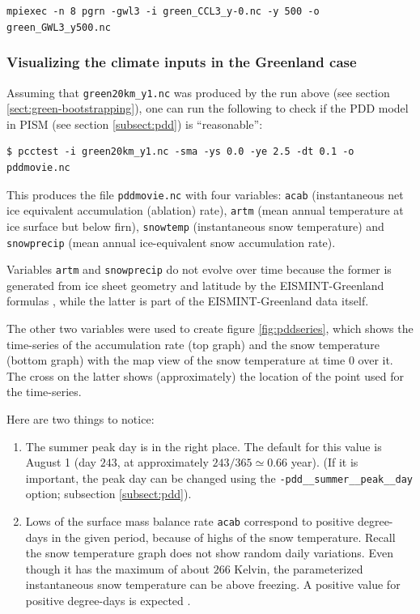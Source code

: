 \documentclass[11pt,final]{amsart}
\newcommand{\und}{\_\!\_}
\begin{document}
\verb|mpiexec -n 8 pgrn -gwl3 -i green_CCL3_y-0.nc -y 500 -o green_GWL3_y500.nc|

\subsubsection*{Visualizing the climate inputs in the Greenland case}
\label{sec:pdd-series-with-pcctest}

Assuming that \verb|green20km_y1.nc| was produced by the run above (see section
\ref{sect:green-bootstrapping}), one can run the following to check if the PDD
model in PISM (see section \ref{subsect:pdd}) is ``reasonable'':
\begin{verbatim}
$ pcctest -i green20km_y1.nc -sma -ys 0.0 -ye 2.5 -dt 0.1 -o pddmovie.nc
\end{verbatim}
This produces the file \verb|pddmovie.nc| with four variables: \verb|acab|
(instantaneous net ice equivalent accumulation (ablation) rate), \verb|artm|
(mean annual temperature at ice surface but below firn), \verb|snowtemp|
(instantaneous snow temperature) and \verb|snowprecip| (mean annual
ice-equivalent snow accumulation rate).

Variables \verb|artm| and \verb|snowprecip| do not evolve over time because the 
former is generated from ice sheet geometry and latitude by the EISMINT-Greenland
formulas \cite{RitzEISMINT}, while the latter is part of the EISMINT-Greenland data
itself.

The other two variables were used to create figure \ref{fig:pddseries}, which
shows the time-series of the accumulation rate (top graph) and the snow
temperature (bottom graph) with the map view of the snow temperature at time 0
over it. The cross on the latter shows (approximately) the location of the
point used for the time-series.

Here are two things to notice:
\begin{enumerate}
\item The summer peak day is in the right place.  The default for this value is
  August 1 (day $243$, at approximately $243/365 \simeq 0.66$ year).  (If it is
  important, the peak day can be changed using the \texttt{-pdd\und summer\und peak\und day}
  option; subsection \ref{subsect:pdd}).

\item Lows of the surface mass balance rate \verb|acab| correspond to 
  positive degree-days in the given period, because of highs of the snow 
  temperature.  Recall the snow temperature graph does
  not show random daily variations.  Even though it has the maximum of about $266$
  Kelvin, the parameterized instantaneous snow temperature can be above freezing.
  A positive value for positive degree-days is expected \cite{CalovGreve05}.
\end{enumerate}
\end{document}
